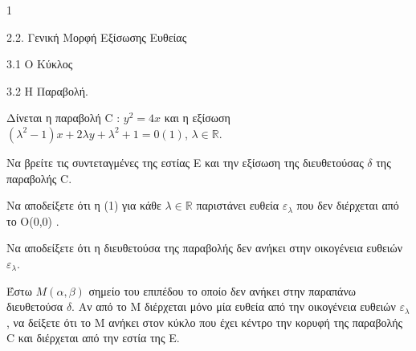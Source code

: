 \begin{ylh}{1}
    \item 2.2. Γενική Μορφή Εξίσωσης Ευθείας
    \item 3.1 Ο Κύκλος
    \item 3.2 Η Παραβολή.
\end{ylh}
Δίνεται η παραβολή C : $y^2 = 4x$ και η εξίσωση $(\lambda^2 - 1)x+2\lambda y+\lambda^2 +1=0 (1)$, $\lambda \in \mathbb{R}$.
\begin{alist}
\item Να βρείτε τις συντεταγμένες της εστίας E και την εξίσωση της διευθετούσας $\delta$ της παραβολής C. 
\item Να αποδείξετε ότι η (1) για κάθε $\lambda \in \mathbb{R}$ παριστάνει ευθεία $\varepsilon_\lambda$ που δεν διέρχεται από το O(0,0) . 
\item Να αποδείξετε ότι η διευθετούσα της παραβολής δεν ανήκει στην οικογένεια ευθειών $\varepsilon_\lambda$. 
\item Έστω $M(\alpha,\beta)$ σημείο του επιπέδου το οποίο δεν ανήκει στην παραπάνω διευθετούσα $\delta$. Αν από το M διέρχεται μόνο μία ευθεία από την οικογένεια ευθειών $\varepsilon_\lambda$, να δείξετε ότι το M ανήκει στον κύκλο που έχει κέντρο την κορυφή της παραβολής C και διέρχεται από την εστία της E. 
\end{alist}